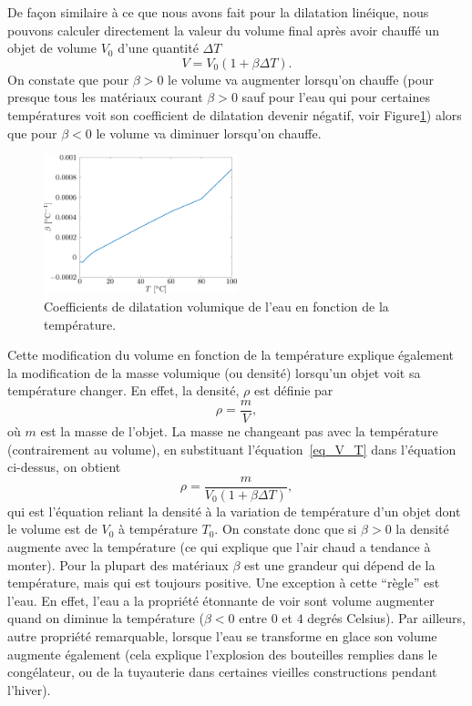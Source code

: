 \documentclass[a4paper,12pt]{book}
\begin{document}
De façon similaire à ce que nous avons fait pour la dilatation linéique, nous pouvons calculer directement la valeur du volume final après avoir  chauffé un objet de volume $V_0$ d'une quantité $\Delta T$
\begin{equation}
V=V_0(1+\beta\Delta T).\label{eq_V_T}
\end{equation}
On constate que pour $\beta>0$ le volume va augmenter lorsqu'on chauffe (pour presque tous les matériaux courant $\beta>0$ sauf pour l'eau qui pour certaines températures voit son coefficient de dilatation devenir négatif, voir Figure\ref{fig_alpha_eau}) alors que pour $\beta<0$ le volume va diminuer lorsqu'on chauffe.
\begin{figure}
\begin{center}
\includegraphics[width=0.5\textwidth]{figs/alpha_eau.pdf}
\caption{Coefficients de dilatation volumique de l'eau en fonction de la température.}
\label{fig_alpha_eau}
\end{center}
\end{figure}

Cette modification du volume en fonction de la température explique également la modification de la masse volumique (ou densité) lorsqu'un objet voit sa température changer. En effet, la densité, $\rho$ est définie par
\begin{equation}
\rho=\frac{m}{V},
\end{equation}
où $m$ est la masse de l'objet. La masse ne changeant pas avec la température (contrairement au volume), en substituant l'équation~\eqref{eq_V_T} dans l'équation ci-dessus, on obtient
\begin{equation}
\rho=\frac{m}{V_0(1+\beta\Delta T)},
\end{equation}
qui est l'équation reliant la densité à la variation de température d'un objet dont le volume est de $V_0$ à température $T_0$.
On constate donc que si $\beta> 0$ la densité augmente avec la température (ce qui explique que l'air chaud a tendance à monter).
Pour la plupart des matériaux $\beta$ est une grandeur qui dépend de la température, mais qui est toujours positive.
Une exception à cette ``règle'' est l'eau. En effet, l'eau a la propriété étonnante de voir sont volume augmenter quand on 
diminue la température ($\beta<0$ entre $0$ et $4$ degrés Celsius). Par ailleurs, autre propriété remarquable, lorsque l'eau se transforme en glace son volume 
augmente également (cela explique l'explosion des bouteilles remplies dans le congélateur, ou de la tuyauterie dans certaines 
vieilles constructions pendant l'hiver).
\end{document}
